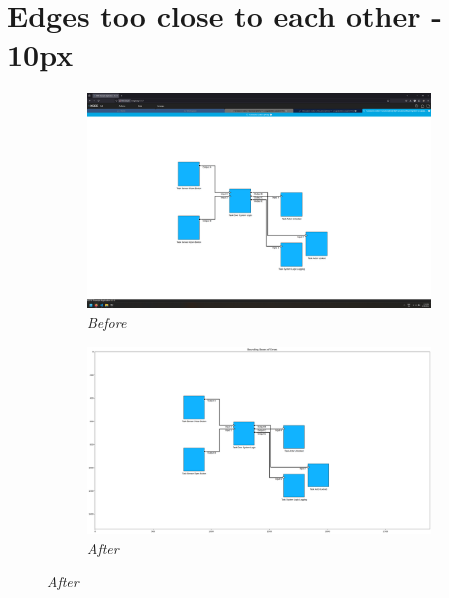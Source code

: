 \documentclass{article}
\begin{document}
\section{Edges too close to each other - 10px}
\begin{figure}[H]
    \centering
    \begin{subfigure}[t]{0.9\textwidth}
        \centering
        \includegraphics[width=\textwidth]{testcases/edge_too_close_10px_normal/151536-922393_input_image.png}
        \caption*{\textit{Before}}
    \end{subfigure}
    \newline    
    \begin{subfigure}[t]{0.9\textwidth}
        \centering
        \includegraphics[width=\textwidth]{testcases/edge_too_close_10px_normal/151548-984416_element_bbox_errors_labeled_colored.png}
        \caption*{\textit{After}}
    \end{subfigure}
    \label{fig:edges_too_close_10}
\end{figure}
\newpage
\end{document}
